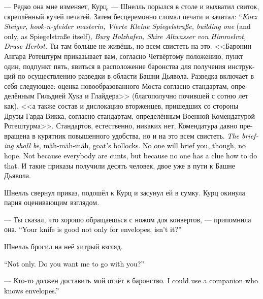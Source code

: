 \documentclass[a4paper,12pt,fleqn]{book}\usepackage{cooltooltips}\usepackage{polyglossia}\setdefaultlanguage[babelshorthands=true]{russian}\setotherlanguage{english}\defaultfontfeatures{Ligatures=TeX,Mapping=tex-text} \usepackage{xcolor}\definecolor{lightgray}{HTML}{bbbbbb}\color{lightgray}\newcommand{\ml}[3]{\textenglish{\textcolor{black}{#3}}}
\begin{document}
--- Редко она мне изменяет, Курц, --- Шнелль порылся в столе и выхватил свиток, скреплённый кучей печатей.
Затем бесцеремонно сломал печати и зачитал:
\ml{$0$}
{--- <<Курц Штайгер, мастер хука и глайдера, адрес проживания Фирте Кляйне Шпигельштрассе, дом первый>> (и единственный, как и сама Шпигельштрассе), <<бург Хольцхафен, земля Альтвассер фон Химмельрот, Друза Хербст>>.}
{``\textit{Kurz Steiger, hook-n-gleider masterin, Vierte Kleine Spiegelstraße, building one} (and only, as Spiegelstraße itself), \textit{Burg Holzhafen, Shire Altwasser von Himmelrot, Druse Herbst.}}
Ты там больше не живёшь, но всем свистеть на это.
<<Баронин Ангара Ротештурм приказывает вам, согласно Четвёртому положению, пункт один, подпункт пять, явиться в расположение баронства для получения инструкций по осуществлению разведки в области Башни Дьявола.
Разведка включает в себя следующее: оценка новообразованного Моста согласно стандартам, определённым Гильдией Хука и Глайдера>> (благополучно почившей с сотню лет как), <<а также состав и дислокацию вторженцев, пришедших со стороны Друзы Гарда Викка, согласно стандартам, определённым Военной Комендатурой Ротештурма>>.
Стандартов, естественно, никаких нет, Комендатура давно превращена в курятник повышенного удобства, но и на это всем свистеть.
\ml{$0$}
{<<Инструктаж должен быть осуществлён>>, мя-мя-мя, козьи яйца.}
{\textit{The briefing shall be}, mäh-mäh-mäh, goat's bollocks.}
\ml{$0$}
{Инструктировать тебя никто не будет, даже не надейся.}
{No one will brief you, though, no hope.}
\ml{$0$}
{Не потому что все такие вредные, а потому что никто понятия не имеет, как тебя инструктировать.}
{Not because everybody are cunts, but because no one has a clue how to do that.}
И такие приказы получили десять человек, двое уже в пути к Башне Дьявола.

Шнелль свернул приказ, подошёл к Курц и засунул ей в сумку.
Курц окинула парня оценивающим взглядом.

--- Ты сказал, что хорошо обращаешься с ножом для конвертов, --- припомнила она.
\ml{$0$}
{--- Ты ведь не только конверты режешь?}
{``Your knife is good not only for envelopes, isn't it?''}

Шнелль бросил на неё хитрый взгляд.

\ml{$0$}
{--- Не только.}
{``Not only.}
\ml{$0$}
{Ты хочешь взять меня с собой?}
{Do you want me to go with you?''}

--- Кто-то должен доставить мой отчёт в баронство.
\ml{$0$}
{Мне бы не помешал спутник, знающий толк в конвертах.}
{I could use a companion who knows envelopes.''}
\end{document}
